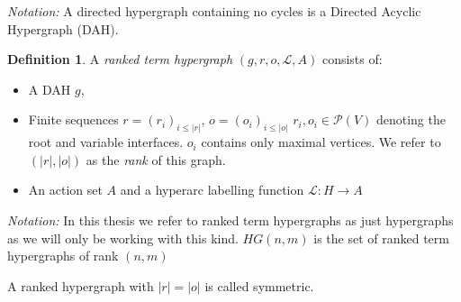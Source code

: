 \documentclass[12pt]{article}
\theoremstyle{definition}
\newtheorem{definition}[theorem]{Definition}
\renewcommand{\P}{\mathcal{P}}
\newcommand{\1}{\mathbbm{1}}
\renewcommand{\L}{\mathcal{L}}
\begin{document}
\emph{Notation:} A directed hypergraph containing no cycles is a Directed Acyclic Hypergraph (DAH).

\begin{definition}
A \emph{ranked term hypergraph} $(g, r, o, \L, A)$ consists of:
\begin{itemize}
\item A DAH $g$,
\item Finite sequences $r = (r_i)_{i\leq |r|}$, $o = (o_i)_{i\leq |o|}$ $r_i, o_i\in \P(V)$ denoting the root and variable interfaces. $o_i$ contains only maximal vertices. We refer to $(|r|, |o|)$ as the \emph{rank} of this graph.
\item An action set $A$ and a hyperarc labelling function $\L: H\to A$
\end{itemize}
\end{definition}
\emph{Notation:} In this thesis we refer to ranked term hypergraphs as just hypergraphs as we will only be working with this kind. $HG(n,m)$ is the set of ranked term  hypergraphs of rank $(n,m)$

A ranked hypergraph with $|r| = |o|$ is called symmetric.
\end{document}
